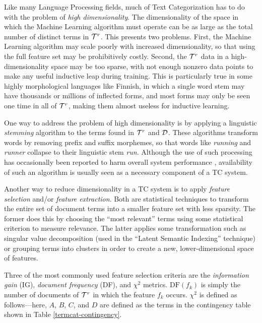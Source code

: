 Like many Language Processing fields, much of Text Categorization has
to do with the problem of \emph{high dimensionality}.
\cite[p. 13]{sebastiani:02} \cite[p. XXX]{manning:99} \cite{joachims:98} The
dimensionality of the space in which the Machine Learning algorithm
must operate can be as large as the total number of distinct terms in
$\mathcal{T}^r$.  This presents two problems.  First, the Machine Learning
algorithm may scale poorly with increased dimensionality, so that
using the full feature set may be prohibitively costly.  Second, the
$\mathcal{T}^r$ data in a high-dimensionality space may be too sparse, with
not enough nonzero data points to make any useful inductive leap
during training.  This is particularly true in some highly
morphological languages like Finnish, in which a single word stem may
have thousands or millions of inflected forms, and most forms may only
be seen one time in all of $\mathcal{T}^r$, making them almost useless for
inductive learning.

One way to address the problem of high dimensionality is by applying a
linguistic \emph{stemming} algorithm to the terms found in $\mathcal{T}^r$
and $\mathcal{D}$.  These algorithms transform words by removing prefix and
suffix morphemes, so that words like \emph{running} and \emph{runner}
collapse to their linguistic stem \emph{run}.  Although the use of
such processing has occasionally been reported to harm overall system
performance \cite{baker:98}, availability of such an algorithm is
usually seen as a necessary component of a TC
system.\cite[p. 12]{sebastiani:02}

Another way to reduce dimensionality in a TC system is to apply
\emph{feature selection} and/or \emph{feature extraction}.  Both are
statistical techniques to transform the entire set of document terms
into a smaller feature set with less sparsity.  The former does this
by choosing the ``most relevant'' terms using some statistical
criterion to measure relevance.  The latter
applies some transformation such as singular value decomposition (used
in the ``Latent Semantic Indexing'' technique) or grouping terms into clusters in
order to create a new, lower-dimensional space of features.

Three of the most commonly used feature selection criteria are the
\emph{information gain} (IG), \emph{document frequency} (DF), and
\emph{$\chi^2$} metrics.\cite{yang:97} $\text{DF}(f_k)$ is simply the
number of documents of $\mathcal{T}^r$ in which the feature $f_k$ occurs.
$\chi^2$ is defined as follows---here, $A$, $B$, $C$, and $D$ are
defined as the terms in the contingency table shown in Table
\ref{termcat-contingency}.

